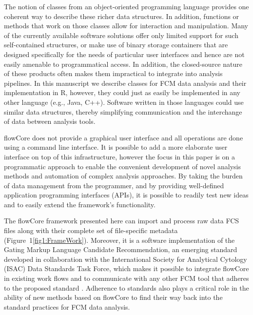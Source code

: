 \documentclass[10pt]{bmc_article}
\newcommand{\Rpackage}[1]{{\textsf{#1}}}
\newenvironment{bmcformat}{\begin{raggedright}\baselineskip20pt\sloppy\setboolean{publ}{false}}{\end{raggedright}\baselineskip20pt\sloppy}
\begin{document}
\begin{bmcformat}
The notion of classes from an object-oriented programming language
provides one coherent way to describe these richer data structures.
In addition, functions or methods that work on those classes allow for
interaction and manipulation. Many of the currently available software
solutions offer only limited support for such self-contained
structures, or make use of binary storage containers that are designed
specifically for the needs of particular user interfaces and hence are
not easily amenable to programmatical access. In addition, the
closed-source nature of these products often makes them impractical to
integrate into analysis pipelines. In this manuscript we describe
classes for FCM data analysis and their implementation in R, however,
they could just as easily be implemented in any other language (e.g.,
Java, C++). Software written in those languages could use similar data
structures, thereby simplifying communication and the interchange of
data between analysis tools.

\Rpackage{flowCore} does not provide a graphical user interface and
all operations are done using a command line interface.  It is
possible to add a more elaborate user interface on top of this
infrastructure, however the focus in this paper is on a programmatic
approach to enable the convenient development of novel analysis
methods and automation of complex analysis approaches.  By taking the
burden of data management from the programmer, and by providing
well-defined application programming interfaces (APIs), it is possible
to readily test new ideas and to easily extend the framework's
functionality.

The \Rpackage{flowCore} framework presented here can import and
process raw data FCS files along with their complete set of
file-specific metadata (Figure~1\ref{fig1:FrameWork}). Moreover, it is
a software implementation of the Gating Markup Language Candidate
Recommendation, an emerging standard developed in collaboration
with the International Society for Analytical Cytology (ISAC) Data
Standards Task Force, which makes it possible to integrate
\Rpackage{flowCore} in existing work flows and to communicate with any
other FCM tool that adheres to the proposed standard
\cite{SpidlenInPressCytometryA}. Adherence to standards also plays a
critical role in the ability of new methods based on
\Rpackage{flowCore} to find their way back into the standard practices
for FCM data analysis.



\end{bmcformat}
\end{document}
